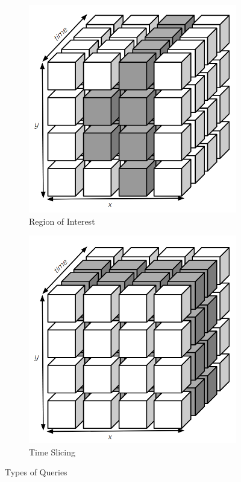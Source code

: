\documentclass[runningheads]{llncs}
\begin{document}
 \begin{figure}[t!]
\centering
\begin{subfigure}{0.25\textwidth}
\includegraphics[width=\linewidth]{Images/atom_ROI.PNG}
\caption{Region of Interest} \label{fig:ROI}
\end{subfigure}
\begin{subfigure}{0.25\textwidth}
\includegraphics[width=\linewidth]{Images/atom_time_slicing.PNG}
\caption{Time Slicing} \label{fig:timeslicing}
\end{subfigure}
\vspace{-0.5em}
\caption{Types of Queries} \label{fig:typesofQuery}
\vspace{-0.75em}
\end{figure}
 
\end{document}
